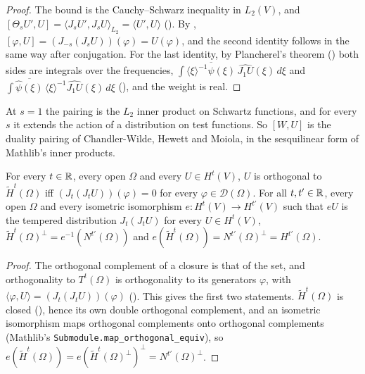 \begin{proof}
\leanok
The bound is the Cauchy--Schwarz inequality in $L_2(V)$, and $[\Theta_s U', U] =
\langle J_s U', J_s U \rangle_{L_2} = \langle U', U \rangle$
(). By ,
$[\varphi, U] = (J_{-s}(J_s U))(\varphi) = U(\varphi)$, and the second identity follows in the
same way after conjugation. For the last identity, by Plancherel's theorem
() both sides are integrals over the frequencies,
$\int \overline{\langle \xi \rangle^{-1} \widehat \psi(\xi)} \, \widehat{J_1 U}(\xi) \, d\xi$ and
$\int \overline{\widehat \psi(\xi)} \, \langle \xi \rangle^{-1} \widehat{J_1 U}(\xi) \, d\xi$
(), and the weight is real.
\end{proof}

At $s = 1$ the pairing is the $L_2$ inner product on Schwartz functions, and for every $s$ it
extends the action of a distribution on test functions. So $[W, U]$ is the duality pairing of
Chandler-Wilde, Hewett and Moiola, in the sesquilinear form of Mathlib's inner products.

\begin{proposition}
\label{prop:orthogonal-tilde}
\leanok
{}
For every $t \in \mathbb{R}$, every open $\Omega$ and every $U \in H^t(V)$, $U$ is orthogonal to
$\tilde H^t(\Omega)$ iff $(J_t(J_t U))(\varphi) = 0$ for every $\varphi \in \mathcal D(\Omega)$.
For all $t, t' \in \mathbb{R}$, every open $\Omega$ and every isometric isomorphism
$e : H^t(V) \to H^{t'}(V)$ such that $e U$ is the tempered distribution $J_t(J_t U)$ for every
$U \in H^t(V)$, $\tilde H^t(\Omega)^\perp = e^{-1}(N^{t'}(\Omega))$ and
$e(\tilde H^t(\Omega)) = N^{t'}(\Omega)^\perp = H^{t'}(\Omega)$.
\end{proposition}

\begin{proof}
\leanok
The orthogonal complement of a closure is that of the set, and orthogonality to $T^t(\Omega)$ is
orthogonality to its generators $\varphi$, with
$\langle \varphi, U \rangle = (J_t(J_t U))(\varphi)$ (). This
gives the first two statements. $\tilde H^t(\Omega)$ is closed
(), hence its own double orthogonal complement, and
an isometric isomorphism maps orthogonal complements onto orthogonal complements (Mathlib's
\texttt{Submodule.\allowbreak map\_\allowbreak orthogonal\_\allowbreak equiv}), so
$e(\tilde H^t(\Omega)) = e(\tilde H^t(\Omega)^\perp)^\perp = N^{t'}(\Omega)^\perp$.
\end{proof}

